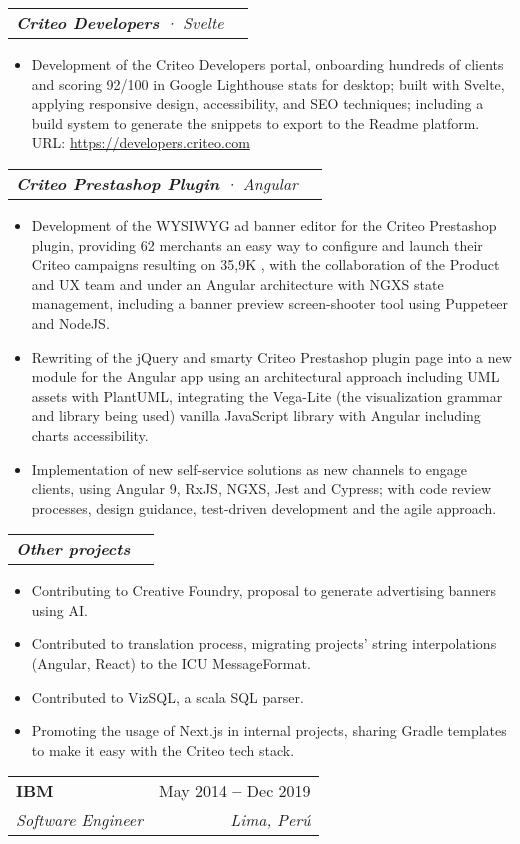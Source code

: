 \documentclass[letterpaper,11pt]{article}
\makeatletter
\newcommand{\resumeItem}[1]{
  \item\small{
    {#1 \vspace{-2pt}}
  }
}
\newcommand{\resumeSubheading}[4]{
  \vspace{-4pt}\item
    \begin{tabular*}{0.97\textwidth}[t]{l@{\extracolsep{\fill}}r}
      \textbf{#1} & \small#2 \\
      \textit{\small#3} & \textit{\small #4} \\
    \end{tabular*}\vspace{-7pt}
}
\newcommand{\resumeSubSubheading}[2]{
    \vspace{-2pt}\item
    \begin{tabular*}{0.97\textwidth}{l@{\extracolsep{\fill}}r}
      \textit{\small#1} & \textit{\small #2} \\
    \end{tabular*}\vspace{-7pt}
}
\newcommand{\resumeItemListStart}{\begin{itemize}}
\newcommand{\resumeItemListEnd}{\end{itemize}\vspace{-5pt}}
\makeatother
\begin{document}
      \resumeSubSubheading{\textbf{Criteo Developers} · Svelte }{}
      \resumeItemListStart
        \resumeItem{Development of the Criteo Developers portal, onboarding hundreds of clients and scoring 92/100 in Google Lighthouse stats for desktop; built with Svelte, applying responsive design, accessibility, and SEO techniques; including a build system to generate the snippets to export to the Readme platform.
        \\[1.5pt]
        URL: {\href{https://developers.criteo.com}{\color{blue}https://developers.criteo.com}}
        }
      \resumeItemListEnd

      \resumeSubSubheading{\textbf{Criteo Prestashop Plugin} · Angular}{}
      \resumeItemListStart
        \resumeItem{Development of the WYSIWYG ad banner editor for the Criteo Prestashop plugin, providing 62 merchants an easy way to configure and launch their Criteo campaigns resulting on 35,9K , with the collaboration of the Product and UX team and under an Angular architecture with NGXS state management, including a banner preview screen-shooter tool using Puppeteer and NodeJS.}
        \resumeItem{Rewriting of the jQuery and smarty Criteo Prestashop plugin page into a new module for the Angular app using an architectural approach including UML assets with PlantUML, integrating the Vega-Lite (the visualization grammar and library being used) vanilla JavaScript library with Angular including charts accessibility.}
        \resumeItem{Implementation of new self-service solutions as new channels to engage clients, using Angular 9, RxJS, NGXS, Jest and Cypress; with code review processes, design guidance, test-driven development and the agile approach.}
      \resumeItemListEnd

      \resumeSubSubheading{\textbf{Other projects} }{}
        \resumeItemListStart
          \resumeItem{Contributing to Creative Foundry, proposal to generate advertising banners using AI.}
          \resumeItem{Contributed to translation process, migrating projects' string interpolations (Angular, React) to the ICU MessageFormat.}
          \resumeItem{Contributed to VizSQL, a scala SQL parser.}
          \resumeItem{Promoting the usage of Next.js in internal projects, sharing Gradle templates to make it easy with the Criteo tech stack.}
        \resumeItemListEnd

    \resumeSubheading
    {IBM}{May 2014 \textbf{--} Dec 2019}
    {Software Engineer}{Lima, Perú}
    \vspace{8pt}
\end{document}
